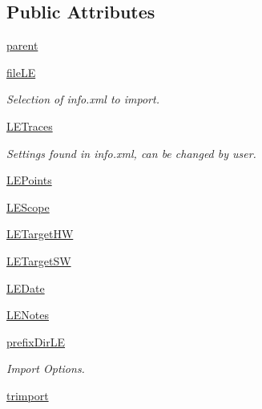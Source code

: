 \subsection*{Public Attributes}
\begin{DoxyCompactItemize}
\item 
\hyperlink{classsoftware_1_1chipwhisperer_1_1common_1_1traces_1_1TraceContainerDPAv3_1_1ImportDPAv3Dialog_a1254139a4849a9c392a76660f0b3f447}{parent}
\item 
\hyperlink{classsoftware_1_1chipwhisperer_1_1common_1_1traces_1_1TraceContainerDPAv3_1_1ImportDPAv3Dialog_a451dbca735c0ea0cdd29577d639e21e4}{file\+L\+E}
\begin{DoxyCompactList}\small\item\em Selection of info.\+xml to import. \end{DoxyCompactList}\item 
\hyperlink{classsoftware_1_1chipwhisperer_1_1common_1_1traces_1_1TraceContainerDPAv3_1_1ImportDPAv3Dialog_a8b9b90e56569f5ce2e8090057c0c4a8a}{L\+E\+Traces}
\begin{DoxyCompactList}\small\item\em Settings found in info.\+xml, can be changed by user. \end{DoxyCompactList}\item 
\hyperlink{classsoftware_1_1chipwhisperer_1_1common_1_1traces_1_1TraceContainerDPAv3_1_1ImportDPAv3Dialog_aca2ce0207bb217a9602c7071f052a59d}{L\+E\+Points}
\item 
\hyperlink{classsoftware_1_1chipwhisperer_1_1common_1_1traces_1_1TraceContainerDPAv3_1_1ImportDPAv3Dialog_aaed8b45895879c0ec9180544072352e8}{L\+E\+Scope}
\item 
\hyperlink{classsoftware_1_1chipwhisperer_1_1common_1_1traces_1_1TraceContainerDPAv3_1_1ImportDPAv3Dialog_aa18f50cd04f9119d116c56753147d33b}{L\+E\+Target\+H\+W}
\item 
\hyperlink{classsoftware_1_1chipwhisperer_1_1common_1_1traces_1_1TraceContainerDPAv3_1_1ImportDPAv3Dialog_a07c0ca40a1e232c52bda9775c0cc02f6}{L\+E\+Target\+S\+W}
\item 
\hyperlink{classsoftware_1_1chipwhisperer_1_1common_1_1traces_1_1TraceContainerDPAv3_1_1ImportDPAv3Dialog_a1abdc14ed5207a0170526ad1df344c5a}{L\+E\+Date}
\item 
\hyperlink{classsoftware_1_1chipwhisperer_1_1common_1_1traces_1_1TraceContainerDPAv3_1_1ImportDPAv3Dialog_a4150ecb693edb8a61987d6fca245a042}{L\+E\+Notes}
\item 
\hyperlink{classsoftware_1_1chipwhisperer_1_1common_1_1traces_1_1TraceContainerDPAv3_1_1ImportDPAv3Dialog_a2e51a145f598b93a272f81c1ceedd847}{prefix\+Dir\+L\+E}
\begin{DoxyCompactList}\small\item\em Import Options. \end{DoxyCompactList}\item 
\hyperlink{classsoftware_1_1chipwhisperer_1_1common_1_1traces_1_1TraceContainerDPAv3_1_1ImportDPAv3Dialog_a6c11dadab6221c31994f6c850fc49a4a}{trimport}
\end{DoxyCompactItemize}


